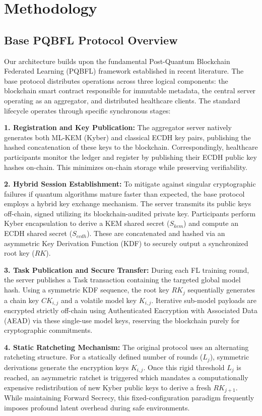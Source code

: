 \documentclass[journal, 10pt, twocolumn]{IEEEtran}
\begin{document}
\section{Methodology}
\subsection{Base PQBFL Protocol Overview}
Our architecture builds upon the fundamental Post-Quantum Blockchain Federated Learning (PQBFL) framework established in recent literature. The base protocol distributes operations across three logical components: the blockchain smart contract responsible for immutable metadata, the central server operating as an aggregator, and distributed healthcare clients. The standard lifecycle operates through specific synchronous stages:

\textbf{1. Registration and Key Publication:} The aggregator server natively generates both ML-KEM (Kyber) and classical ECDH key pairs, publishing the hashed concatenation of these keys to the blockchain. Correspondingly, healthcare participants monitor the ledger and register by publishing their ECDH public key hashes on-chain. This minimizes on-chain storage while preserving verifiability.

\textbf{2. Hybrid Session Establishment:} To mitigate against singular cryptographic failures if quantum algorithms mature faster than expected, the base protocol employs a hybrid key exchange mechanism. The server transmits its public keys off-chain, signed utilizing its blockchain-audited private key. Participants perform Kyber encapsulation to derive a KEM shared secret ($S_{kem}$) and compute an ECDH shared secret ($S_{ecdh}$). These are concatenated and hashed via an asymmetric Key Derivation Function (KDF) to securely output a synchronized root key ($RK$).

\textbf{3. Task Publication and Secure Transfer:} During each FL training round, the server publishes a Task transaction containing the targeted global model hash. Using a symmetric KDF sequence, the root key $RK_j$ sequentially generates a chain key $CK_{i,j}$ and a volatile model key $K_{i,j}$. Iterative sub-model payloads are encrypted strictly off-chain using Authenticated Encryption with Associated Data (AEAD) via these single-use model keys, reserving the blockchain purely for cryptographic commitments.

\textbf{4. Static Ratcheting Mechanism:} The original protocol uses an alternating ratcheting structure. For a statically defined number of rounds ($L_j$), symmetric derivations generate the encryption keys $K_{i,j}$. Once this rigid threshold $L_j$ is reached, an asymmetric ratchet is triggered which mandates a computationally expensive redistribution of new Kyber public keys to derive a fresh $RK_{j+1}$. While maintaining Forward Secrecy, this fixed-configuration paradigm frequently imposes profound latent overhead during safe environments.
\end{document}
